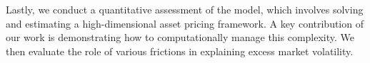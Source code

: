 Lastly, we conduct a quantitative assessment of the model, which involves solving and estimating a high-dimensional asset pricing framework. A key contribution of our work is demonstrating how to computationally manage this complexity. We then evaluate the role of various frictions in explaining excess market volatility.





